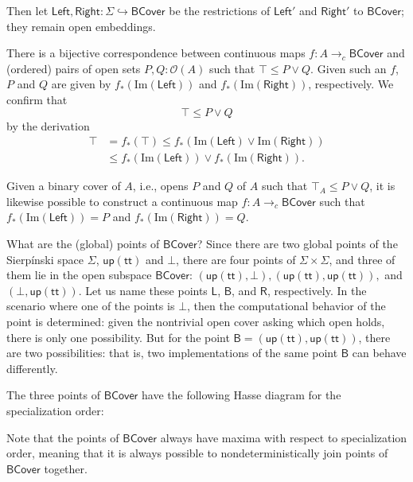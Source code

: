 \documentclass[conference]{IEEEtran}
\newcommand{\hookto}{\hookrightarrow}
\newcommand{\cto}{\to_c}
\newcommand{\Open}[1]{\mathcal{O}({#1})}
\newcommand{\Img}[1]{\text{Im}\left({#1}\right)}
\newcommand{\strue}{\mathsf{up}(\mathsf{tt})}
\newcommand{\sfalse}{\bot}
\begin{document}
Then let $\mathsf{Left}, \mathsf{Right} : \Sigma \hookto \mathsf{BCover}$ be the restrictions of $\mathsf{Left}'$ and $\mathsf{Right}'$ to $\mathsf{BCover}$; they remain open embeddings.

There is a bijective correspondence between continuous maps $f : A \cto \mathsf{BCover}$ and (ordered) pairs of open sets $P, Q : \Open{A}$ such that $\top \le P \vee Q$. Given such an $f$, $P$ and $Q$ are given by $f_*(\Img{\mathsf{Left}})$ and $f_*(\Img{\mathsf{Right}})$, respectively. We confirm that
\[
\top \le P \vee Q
\]
by the derivation
\begin{align*}
\top &= f_*(\top) 
  \le f_*(\Img{\mathsf{Left}} \vee \Img{\mathsf{Right}})
 \\ &\le f_*(\Img{\mathsf{Left}}) \vee f_*(\Img{\mathsf{Right}}).
\end{align*}

Given a binary cover of $A$, i.e., opens $P$ and $Q$ of $A$ such that $\top_A \le P \vee Q$, it is likewise possible to construct a continuous map $f: A \cto \mathsf{BCover}$ such that $f_*(\Img{\mathsf{Left}}) = P$ and $f_*(\Img{\mathsf{Right}}) = Q$.

What are the (global) points of $\mathsf{BCover}$? Since there are two global points of the Sierp\'inski space $\Sigma$, $\strue$ and $\sfalse$, there are four points of $\Sigma \times \Sigma$, and three of them lie in the open subspace $\mathsf{BCover}$: $(\strue, \sfalse), (\strue, \strue),$ and $(\sfalse, \strue)$. Let us name these points $\mathsf{L}$, $\mathsf{B}$, and $\mathsf{R}$, respectively. In the scenario where one of the points is $\sfalse$, then the computational behavior of the point is determined: given the nontrivial open cover asking which open holds, there is only one possibility. But for the point $\mathsf{B} = (\strue, \strue)$, there are two possibilities: that is, two implementations of the same point $\mathsf{B}$ can behave differently.

The three points of $\mathsf{BCover}$ have the following Hasse diagram for the specialization order:
\begin{center}
\end{center}
Note that the points of $\mathsf{BCover}$ always have maxima with respect to specialization order, meaning that it is always possible to nondeterministically join points of $\mathsf{BCover}$ together.
\end{document}
